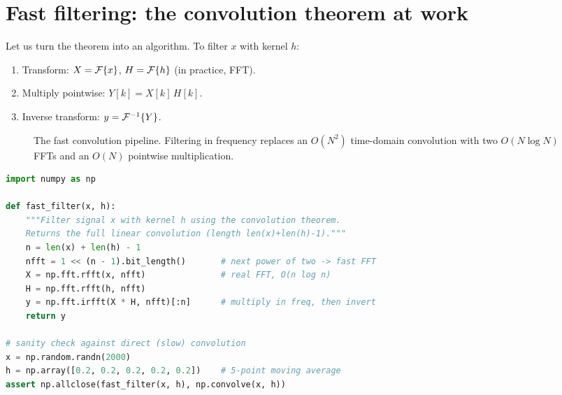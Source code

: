 \section{Fast filtering: the convolution theorem at work}
\label{ch11:fast-filtering}

Let us turn the theorem into an algorithm. To filter $x$ with kernel $h$:
\begin{enumerate}
\item Transform: $X = \mathcal{F}\{x\}$, $H = \mathcal{F}\{h\}$ (in practice, FFT).
\item Multiply pointwise: $Y[k] = X[k]\,H[k]$.
\item Inverse transform: $y = \mathcal{F}^{-1}\{Y\}$.
\end{enumerate}

\begin{figure}[H]
\centering
{}
\caption{The fast convolution pipeline. Filtering in frequency replaces an $O(N^2)$ time-domain convolution with two $O(N\log N)$ FFTs and an $O(N)$ pointwise multiplication.}
\label{ch11:fig-fast-pipeline}
\end{figure}

\begin{lstlisting}[language=Python, caption={Fast filtering via the convolution theorem.}]
import numpy as np

def fast_filter(x, h):
    """Filter signal x with kernel h using the convolution theorem.
    Returns the full linear convolution (length len(x)+len(h)-1)."""
    n = len(x) + len(h) - 1
    nfft = 1 << (n - 1).bit_length()       # next power of two -> fast FFT
    X = np.fft.rfft(x, nfft)               # real FFT, O(n log n)
    H = np.fft.rfft(h, nfft)
    y = np.fft.irfft(X * H, nfft)[:n]      # multiply in freq, then invert
    return y

# sanity check against direct (slow) convolution
x = np.random.randn(2000)
h = np.array([0.2, 0.2, 0.2, 0.2, 0.2])    # 5-point moving average
assert np.allclose(fast_filter(x, h), np.convolve(x, h))
\end{lstlisting}

